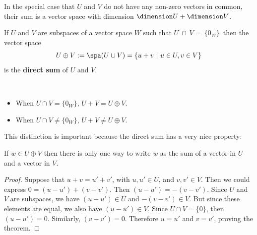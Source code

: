 In the special case that $U$ and $V$ do not have any non-zero vectors in common, their sum is a vector space with dimension $\dimension U + \dimension V$. 


\begin{definition}
If  $U$ and $V$ are subspaces of a vector space $W$ such that 
$U~\cap~V=~\{0_W\}\, $
then the vector space
\[
U \oplus V := \spa (U\cup V)= \{u+v ~|~ u\in U, v\in V \}
\]
is the {\bfseries direct sum} of $U$ and $V$.
\end{definition}

\begin{remark}

$\phantom{JUNK HERE}$\\[-8mm]

\begin{itemize}
\item When $U\cap V= \{0_W\}$, $U+V=U\oplus V.$ 
\item When $U\cap V \neq \{0_W\}$, $U+V \neq U\oplus V$.
\end{itemize}
\end{remark}

\noindent This distinction is important because the direct sum has a very nice property:

\begin{theorem}
If $w\in U\oplus V$  then 
there is only one way to write \(w\) as the sum of a vector in \(U\) and a vector in \(V\).  
\end{theorem}

\begin{proof}
Suppose that $u+v=u'+v'$, with $u,u'\in U$, and $v,v' \in V$.  Then we could express $0=(u-u')+(v-v')$.  Then $(u-u')=-(v-v')$.  Since $U$ and $V$ are subspaces, we have $(u-u')\in U$ and $-(v-v')\in V$.  But since these elements are equal, we also have $(u-u')\in V$.  Since $U\cap V=\{0\}$, then $(u-u')=0$.  Similarly, $(v-v')=0$. Therefore $u=u'$ and  $v=v'$, proving the theorem. 
\end{proof}



